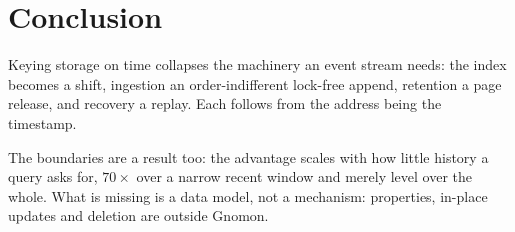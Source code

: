 \documentclass[letterpaper,twocolumn,10pt]{article}
\newcommand{\sys}{Gnomon\xspace}
\begin{document}
\section{Conclusion}
Keying storage on time collapses the machinery an event stream needs:
the index becomes a shift, ingestion an order-indifferent lock-free
append, retention a page release, and recovery a replay. Each follows
from the address being the timestamp.

The boundaries are a result too: the advantage scales with how little
history a query asks for, $70\times$ over a narrow recent window and
merely level over the whole. What is missing is a data model, not a
mechanism: properties, in-place updates and deletion are outside \sys.



\end{document}
